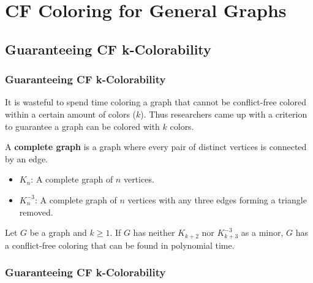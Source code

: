 \documentclass[xcolor=dvipsnames,aspectratio=1610]{beamer}
\begin{document}

  \section{CF Coloring for General Graphs}
  \subsection{Guaranteeing CF k-Colorability}
  \begin{frame}
    \frametitle{Guaranteeing CF k-Colorability}

    It is wasteful to spend time coloring a graph that cannot be conflict-free colored within a certain amount of colors ($k$). Thus researchers came up with a criterion to guarantee a graph can be colored with $k$ colors.

    \pause
    \vfill

    A \textbf{complete graph} is a graph where every pair of distinct vertices is connected by an edge.

    \pause

    \begin{itemize}
      \item $K_n$: A complete graph of $n$ vertices.
      \pause
      \item $K_n^{-3}$: A complete graph of $n$ vertices with any three edges forming a triangle removed.
    \end{itemize}

    \pause
    \vfill

    \begin{theorem}
    Let $G$ be a graph and $k \geq 1$. If $G$ has neither $K_{k+2}$ nor $K_{k+3}^{-3}$ as a minor, $G$ has a conflict-free coloring that can be found in polynomial time.
    \end{theorem}

  \end{frame}

  \begin{frame}
    \frametitle{Guaranteeing CF k-Colorability}

  \end{frame}
\end{document}
